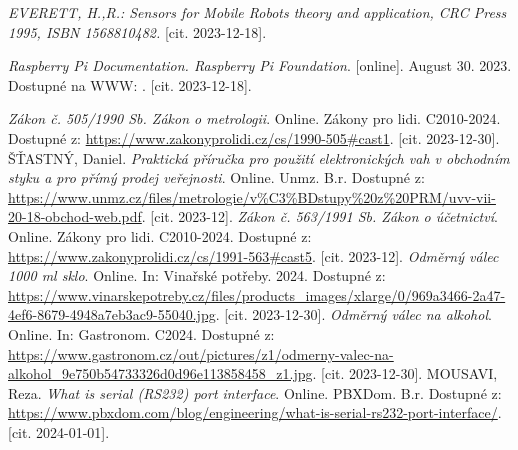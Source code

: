 \begin{thebibliography}{19}

\textit{EVERETT, H.,R.: Sensors for Mobile Robots theory and application, CRC Press 1995, ISBN 1568810482.} [cit. 2023-12-18].

\textit{Raspberry Pi Documentation. Raspberry Pi Foundation}. [online]. August 30. 2023. Dostupné na WWW: . [cit. 2023-12-18].


\textit{Zákon č. 505/1990 Sb. Zákon o metrologii}. Online. Zákony pro lidi. C2010-2024. Dostupné z: \url{https://www.zakonyprolidi.cz/cs/1990-505\#cast1}. [cit. 2023-12-30].
ŠŤASTNÝ, Daniel. \textit{Praktická příručka pro použití elektronických vah v obchodním styku a pro přímý prodej veřejnosti}. Online. Unmz. B.r. Dostupné z: \url{https://www.unmz.cz/files/metrologie/v\%C3\%BDstupy\%20z\%20PRM/uvv-vii-20-18-obchod-web.pdf}. [cit. 2023-12].
\textit{Zákon č. 563/1991 Sb. Zákon o účetnictví}. Online. Zákony pro lidi. C2010-2024. Dostupné z: \url{https://www.zakonyprolidi.cz/cs/1991-563\#cast5}. [cit. 2023-12].
\textit{Odměrný válec 1000 ml sklo}. Online. In: Vinařské potřeby. 2024. Dostupné z: \url{https://www.vinarskepotreby.cz/files/products\_images/xlarge/0/969a3466-2a47-4ef6-8679-4948a7eb3ac9-55040.jpg}. [cit. 2023-12-30].
\textit{Odměrný válec na alkohol}. Online. In: Gastronom. C2024. Dostupné z: \url{https://www.gastronom.cz/out/pictures/z1/odmerny-valec-na-alkohol\_9e750b54733326d0d96e113858458\_z1.jpg}. [cit. 2023-12-30].
MOUSAVI, Reza. \textit{What is serial (RS232) port interface}. Online. PBXDom. B.r. Dostupné z: \url{https://www.pbxdom.com/blog/engineering/what-is-serial-rs232-port-interface/}. [cit. 2024-01-01].

\end{thebibliography}
